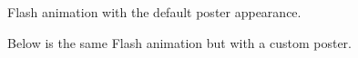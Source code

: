 \documentclass{article}
\begin{document}
\maketitle

Flash animation with the default poster appearance.
\begin{center}


\end{center}

Below is the same Flash animation but with a custom poster.
\begin{center}
\end{center}
\end{document}
